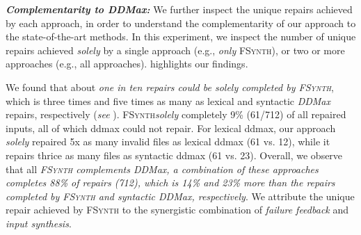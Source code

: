 \documentclass[sigconf,review,anonymous]{acmart}
\newcommand{\approach}{\textsc{FSynth}\xspace}
\newcommand{\ddmax}{\textit{DDMax}\xspace}
\begin{document}



\noindent \textbf{\textit{Complementarity to \ddmax:}} We further inspect the unique repairs achieved by each approach, in order to understand the complementarity of our approach to the state-of-the-art methods. In this experiment, we inspect the number of unique repairs achieved \textit{solely} by a single approach (e.g., \textit{only} \approach), or two or more approaches (e.g., all approaches). 
 highlights our findings. 

We found that about \textit{one in ten repairs could be solely completed by \approach}, which is three times and five times as many as lexical and syntactic \ddmax %
repairs, respectively (\textit{see} ). \approach \textit{solely} completely 9\% (61/712) of all repaired inputs, all of which ddmax could not repair. For lexical ddmax, our approach \textit{solely} repaired 5x as many invalid files as lexical ddmax (61 vs. 12), while it repairs thrice as many files as syntactic ddmax (61 vs. 23). Overall, we observe that all \textit{\approach complements \ddmax, a combination of these approaches completes 88\% of repairs (712), which is 14\% and 23\% more than the repairs completed by \approach and syntactic \ddmax, respectively}. 
We attribute the unique repair achieved by \approach to the synergistic combination of \textit{failure feedback} and \textit{input synthesis}. %
\end{document}
